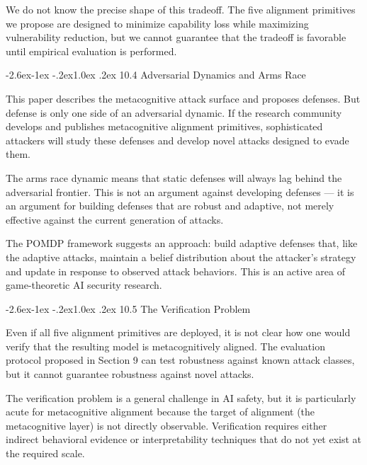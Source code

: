 \documentclass[
  11pt,
]{article}
\makeatletter
\renewcommand\subsection{\@startsection{subsection}{2}{\z@}%
  {-2.6ex\@plus -1ex \@minus -.2ex}{1.0ex \@plus .2ex}%
  {\normalfont\sffamily\large\bfseries}}
\makeatother
\begin{document}
We do not know the precise shape of this tradeoff. The five alignment
primitives we propose are designed to minimize capability loss while
maximizing vulnerability reduction, but we cannot guarantee that the
tradeoff is favorable until empirical evaluation is performed.

\subsection{10.4 Adversarial Dynamics and Arms
Race}\label{adversarial-dynamics-and-arms-race}

This paper describes the metacognitive attack surface and proposes
defenses. But defense is only one side of an adversarial dynamic. If the
research community develops and publishes metacognitive alignment
primitives, sophisticated attackers will study these defenses and
develop novel attacks designed to evade them.

The arms race dynamic means that static defenses will always lag behind
the adversarial frontier. This is not an argument against developing
defenses --- it is an argument for building defenses that are robust and
adaptive, not merely effective against the current generation of
attacks.

The POMDP framework suggests an approach: build adaptive defenses that,
like the adaptive attacks, maintain a belief distribution about the
attacker's strategy and update in response to observed attack behaviors.
This is an active area of game-theoretic AI security research.

\subsection{10.5 The Verification
Problem}\label{the-verification-problem}

Even if all five alignment primitives are deployed, it is not clear how
one would verify that the resulting model is metacognitively aligned.
The evaluation protocol proposed in Section 9 can test robustness
against known attack classes, but it cannot guarantee robustness against
novel attacks.

The verification problem is a general challenge in AI safety, but it is
particularly acute for metacognitive alignment because the target of
alignment (the metacognitive layer) is not directly observable.
Verification requires either indirect behavioral evidence or
interpretability techniques that do not yet exist at the required scale.
\end{document}
